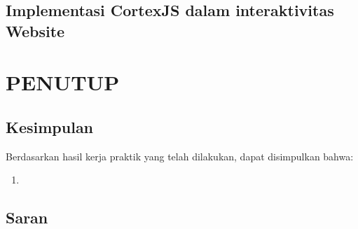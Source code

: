 \documentclass{file/KP-ITS}
\theoremstyle{definition}
\theoremstyle{definition}
\theoremstyle{plain}
\begin{document}
\section{Implementasi CortexJS dalam interaktivitas Website}


\chapter{PENUTUP}
\section{Kesimpulan}
Berdasarkan hasil kerja praktik yang telah dilakukan, dapat disimpulkan bahwa:
\begin{enumerate}
    \item 
\end{enumerate}
\section{Saran}



\DaftarPustaka
\end{document}
